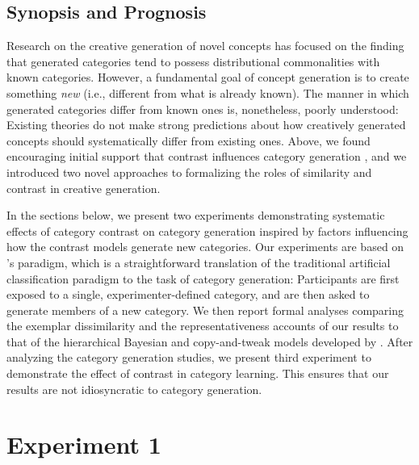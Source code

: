 \documentclass[12pt]{article}
\begin{document}
\begin{flushleft}
\subsection{Synopsis and Prognosis}

Research on the creative generation of novel concepts has focused on the finding
that generated categories tend to possess distributional commonalities with
known categories. However, a fundamental goal of concept generation is to create
something {\em new} (i.e., different from what is already known). The manner in
which generated categories differ from known ones is, nonetheless, poorly
understood: Existing theories do not make strong predictions about how
creatively generated concepts should systematically differ from existing ones.
Above, we found encouraging initial support that contrast influences category
generation \citep[][Experiment 3]{jern2013probabilistic}, and we introduced two
novel approaches to formalizing the roles of similarity and contrast in creative
generation.

In the sections below, we present two experiments demonstrating systematic
effects of category contrast on category generation inspired by factors
influencing how the contrast models generate new categories. Our experiments are
based on \cite{jern2013probabilistic}'s paradigm, which is a straightforward
translation of the traditional artificial classification paradigm to the task of
category generation: Participants are first exposed to a single,
experimenter-defined category, and are then asked to generate members of a new
category. We then report formal analyses comparing the exemplar dissimilarity
and the representativeness accounts of our results to that of the hierarchical
Bayesian and copy-and-tweak models developed by \cite{jern2013probabilistic}.
After analyzing the category generation studies, we present third experiment to
demonstrate the effect of contrast in category learning. This ensures that our
results are not idiosyncratic to category generation.

\section{Experiment 1}


\end{flushleft}
\end{document}
